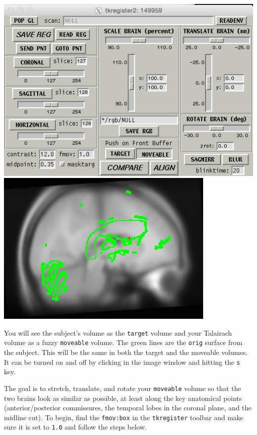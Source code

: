 \documentclass[paper=a4, fontsize=11pt]{scrartcl} %
\numberwithin{equation}{section} %
\numberwithin{figure}{section} %
\numberwithin{table}{section} %
\begin{document}
\includegraphics[scale=0.45]{tal1.png}\includegraphics[scale=0.4]{tal2.jpg}

You will see the subject's volume as the \texttt{target} volume and your Talairach volume as a fuzzy \texttt{moveable} volume. The green lines are the \texttt{orig} surface from the subject. This will be the same in both the target and the moveable volumes. It can be turned on and off by clicking in the image window and hitting the \texttt{s} key.

The goal is to stretch, translate, and rotate your \texttt{moveable} volume so that the two brains look as similar as possible, at least along the key anatomical points (anterior/posterior commissures, the temporal lobes in the coronal plane, and the midline cut).  To begin, find the \texttt{fmov:box} in the \texttt{tkregister} toolbar and make sure it is set to \texttt{1.0} and follow the steps below.
\end{document}
